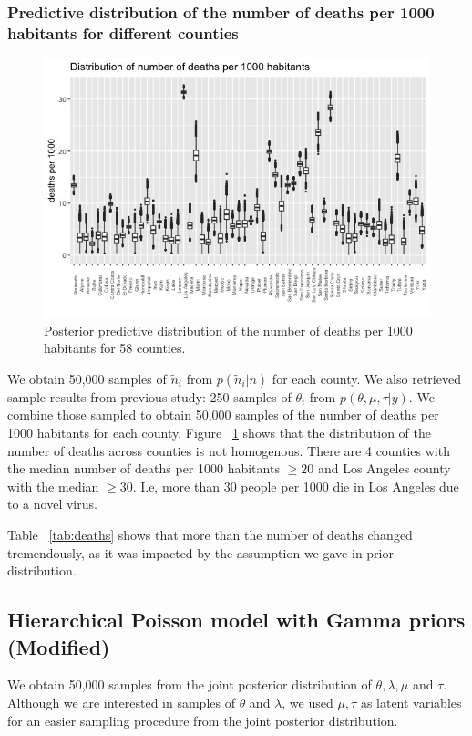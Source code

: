 \documentclass[11pt,twocolumn]{asaproc}
\begin{document}
\subsubsection{Predictive distribution of the number of deaths per 1000 habitants for different counties}

\begin{figure}[t]
\centering\includegraphics[scale=.30]{deaths1.jpeg}
\caption{Posterior predictive distribution of the number of deaths per 1000 habitants for 58 counties. }
\label{fig:deaths1}
\end{figure}

We obtain 50,000 samples of $\tilde{n}_i$ from $p(\tilde{n}_i | n)$ for each county. We also retrieved sample results from previous study: 250 samples of $\theta_i$ from $p(\theta, \mu, \tau | y)$. We combine those sampled to obtain 50,000 samples of the number of deaths per 1000 habitants for each county. Figure ~\ref{fig:deaths1} shows that the distribution of the number of deaths across counties is not homogenous. There are 4 counties with the median number of deaths per 1000 habitants $\geq 20$ and Los Angeles county with the median $\geq 30$. I.e, more than 30 people per 1000 die in Los Angeles due to a novel virus.

Table ~\ref{tab:deaths} shows that more than the number of deaths changed tremendously, as it was impacted by the assumption we gave in prior distribution.








\subsection{Hierarchical Poisson model with Gamma priors (Modified)}
We obtain 50,000 samples from the joint posterior distribution of $\theta, \lambda, \mu$ and $\tau$. Although we are interested in samples of $\theta$ and $\lambda$, we used $\mu, \tau$ as latent variables for an easier sampling procedure from the joint posterior distribution. 
\end{document}
